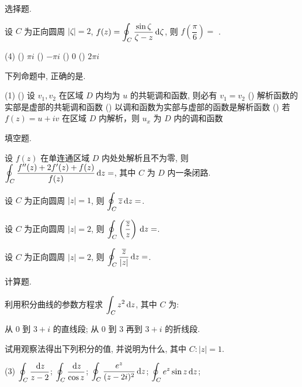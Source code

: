 \sectionHomework
\begin{homework}
	\item 选择题. \begin{exlist}
		\item 设 $C$ 为正向圆周 $|\zeta|=2$, $\displaystyle f(z)=\oint_C\frac{\sin \zeta}{\zeta-z}\,\mathrm{d} \zeta$, 则 $f\left(\dfrac\pi6\right)=$ \fillbrace{}.
			\begin{taskschoice}(4)
				() $\pi i$
				() $-\pi i$
				() $0$
				() $2\pi i$
			\end{taskschoice}
		\item 下列命题中, 正确的是\fillbrace{}.
			\begin{taskschoice}(1)
				() 设 $v_1,v_2$ 在区域 $D$ 内均为 $u$ 的共轭调和函数, 则必有 $v_1=v_2$
				() 解析函数的实部是虚部的共轭调和函数
				() 以调和函数为实部与虚部的函数是解析函数
				() 若 $f(z)=u+iv$ 在区域 $D$ 内解析，则 $u_x$ 为 $D$ 内的调和函数
		\end{taskschoice}
	\end{exlist}
	\item 填空题. \begin{exlist}
		\item 设 $f(z)$ 在单连通区域 $D$ 内处处解析且不为零, 则 $\displaystyle\oint_C\frac{f''(z)+2f'(z)+f(z)}{f(z)}\,\mathrm{d} z=$\fillblank{}, 其中 $C$ 为 $D$ 内一条闭路.
		\item 设 $C$ 为正向圆周 $|z|=1$, 则 $\displaystyle\oint_C\overline z\,\mathrm{d} z=$\fillblank{}.
		\item 设 $C$ 为正向圆周 $|z|=2$, 则 $\displaystyle\oint_C\left(\frac{\overline z}{z}\right)\,\mathrm{d} z=$\fillblank{}.
		\item 设 $C$ 为正向圆周 $|z|=2$, 则 $\displaystyle\oint_C\dfrac{\overline z}{|z|}\,\mathrm{d} z=$\fillblank{}.
	\end{exlist}
	\item 计算题.
	\begin{exlist}
		\item 利用积分曲线的参数方程求 $\displaystyle\int_C z^2\,\mathrm{d} z$, 其中 $C$ 为:
			\begin{tasks}
				\task 从 $0$ 到 $3+i$ 的直线段;
				\task 从 $0$ 到 $3$ 再到 $3+i$ 的折线段.
			\end{tasks}
		\item 试用观察法得出下列积分的值, 并说明为什么, 其中 $C:|z|=1$.
			\begin{tasks}(3)
				\task $\displaystyle\oint_C\frac{\,\mathrm{d} z}{z-2}$;
				\task $\displaystyle\oint_C\frac{\,\mathrm{d} z}{\cos z}$;
				\task $\displaystyle\oint_C\frac{e^z}{(z-2i)^2}\,\mathrm{d} z$;
				\task $\displaystyle\oint_Ce^z\sin z\,\mathrm{d} z$;

\end{tasks}
\end{exlist}
\end{homework}
